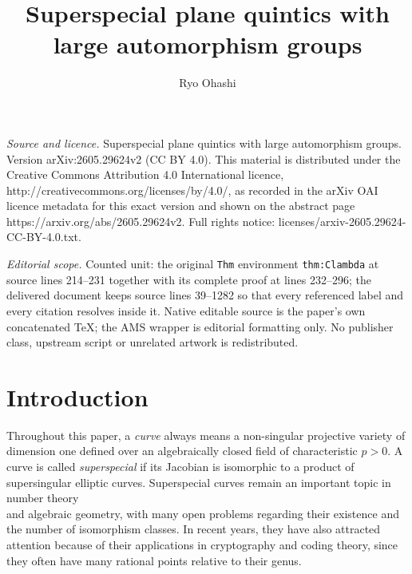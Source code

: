 \documentclass[10pt,a4paper]{amsart}
\begin{document}
\title[Superspecial plane quintics with large automorphism groups]{Superspecial plane quintics with large automorphism groups}
\author{Ryo Ohashi}
\date{}
\maketitle
\noindent\emph{Source and licence.} Superspecial plane quintics with large automorphism groups. Version arXiv:2605.29624v2 (CC BY 4.0). This material is distributed under the Creative Commons Attribution 4.0 International licence, http://creativecommons.org/licenses/by/4.0/, as recorded in the arXiv OAI licence metadata for this exact version and shown on the abstract page https://arxiv.org/abs/2605.29624v2. Full rights notice: licenses/arxiv-2605.29624-CC-BY-4.0.txt.\par\smallskip
\noindent\textit{Editorial scope.} Counted unit: the original \texttt{Thm} environment \texttt{thm:Clambda} at source lines 214--231 together with its complete proof at lines 232--296; the delivered document keeps source lines 39--1282 so that every referenced label and every citation resolves inside it. Native editable source is the paper's own concatenated TeX; the AMS wrapper is editorial formatting only. No publisher class, upstream script or unrelated artwork is redistributed.
\section{Introduction}
Throughout this paper, a \emph{curve} always means a non-singular projective variety of dimension one defined over an algebraically closed field of characteristic $p > 0$.
A curve is called \emph{superspecial} if its Jacobian is isomorphic to a product of supersingular elliptic curves.
Superspecial curves remain an important topic in number theory\\ and algebraic geometry, with many open problems regarding their existence and the number of isomorphism classes.
In recent years, they have also attracted attention because of their applications in cryptography and coding theory, since they often have many rational points relative to their genus.
\end{document}
